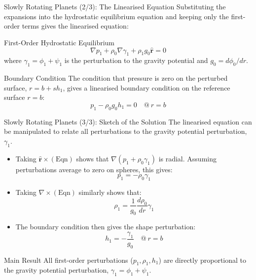 \documentclass{beamer}
\begin{document}
\begin{frame}{Slowly Rotating Planets (2/3): The Linearised Equation}
    Substituting the expansions into the hydrostatic equilibrium equation and keeping only the first-order terms gives the linearised equation:
    \begin{alertblock}{First-Order Hydrostatic Equilibrium}
        $$ \nabla p_{1} + \rho_{0}\nabla\gamma_{1} + \rho_{1}g_{0}\hat{\mathbf{r}} = 0 $$
        where $\gamma_1 = \phi_1 + \psi_1$ is the perturbation to the gravity potential and $g_0 = d\phi_0/dr$.
    \end{alertblock}
    \pause
    \begin{block}{Boundary Condition}
        The condition that pressure is zero on the perturbed surface, $r = b+sh_1$, gives a linearised boundary condition on the reference surface $r=b$:
        $$ p_1 - \rho_0 g_0 h_1 = 0 \quad @ \ r=b $$
    \end{block}
\end{frame}

\begin{frame}{Slowly Rotating Planets (3/3): Sketch of the Solution}
    The linearised equation can be manipulated to relate all perturbations to the gravity potential perturbation, $\gamma_1$.
    \begin{itemize}
        \item Taking $\hat{\mathbf{r}} \times (\text{Eqn})$ shows that $\nabla(p_1 + \rho_0\gamma_1)$ is radial. Assuming perturbations average to zero on spheres, this gives:
        $$ p_1 = -\rho_0 \gamma_1 $$
        \pause
        \item Taking $\nabla \times (\text{Eqn})$ similarly shows that:
        $$ \rho_1 = \frac{1}{g_0} \frac{d\rho_0}{dr} \gamma_1 $$
        \pause
        \item The boundary condition then gives the shape perturbation:
        $$ h_1 = -\frac{\gamma_1}{g_0} \quad @ \ r=b $$
    \end{itemize}
    \begin{alertblock}{Main Result}
        All first-order perturbations ($p_1, \rho_1, h_1$) are directly proportional to the gravity potential perturbation, $\gamma_1 = \phi_1 + \psi_1$.
    \end{alertblock}
\end{frame}
\end{document}
